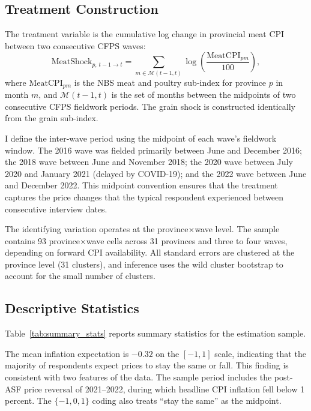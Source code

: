 \subsection{Treatment Construction}\label{sec:shock_construction}

The treatment variable is the cumulative log change in
provincial meat CPI between two consecutive CFPS waves:
\begin{equation}\label{eq:meat_shock_data}
  \mathrm{MeatShock}_{p,\,t-1 \to t}
  = \sum_{m \in \mathcal{M}(t-1,t)}
      \log\!\left(\frac{\mathrm{MeatCPI}_{pm}}{100}\right),
\end{equation}
where $\mathrm{MeatCPI}_{pm}$ is the NBS meat and poultry
sub-index for province $p$ in month $m$, and
$\mathcal{M}(t-1,t)$ is the set of months between the
midpoints of two consecutive CFPS fieldwork periods.
The grain shock is constructed identically from the
grain sub-index.

I define the inter-wave period using the midpoint of each
wave's fieldwork window.
The 2016 wave was fielded primarily between June and December
2016; the 2018 wave between June and November 2018; the 2020
wave between July 2020 and January 2021 (delayed by
COVID-19); and the 2022 wave between June and December 2022.
This midpoint convention ensures that the treatment
captures the price changes that the typical respondent
experienced between consecutive interview dates.

The identifying variation operates at the province$\times$wave
level.
The sample contains 93 province$\times$wave cells across
31 provinces and three to four waves, depending on forward
CPI availability.
All standard errors are clustered at the province level
(31 clusters), and inference uses the wild cluster bootstrap
to account for the small number of clusters.

\subsection{Descriptive Statistics}\label{sec:desc_stats}



Table~\ref{tab:summary_stats} reports summary statistics for
the estimation sample.

The mean inflation expectation is $-0.32$ on the $[-1, 1]$
scale, indicating that the majority of respondents expect
prices to stay the same or fall.
This finding is consistent with two features of the data.
The sample period includes the post-ASF price reversal of
2021--2022, during which headline CPI inflation fell below
1 percent. The $\{-1, 0, 1\}$ coding also treats ``stay the
same'' as the midpoint.

